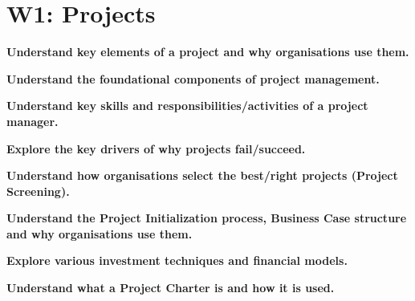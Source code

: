 \section{W1: Projects}

\textbf{Understand key elements of a project and why organisations use them.}

\textbf{Understand the foundational components of project management.}

\textbf{Understand key skills and responsibilities/activities of a project manager.}

\textbf{Explore the key drivers of why projects fail/succeed.}

\textbf{Understand how organisations select the best/right projects (Project Screening).}

\textbf{Understand the Project Initialization process, Business Case structure and why organisations use them.}

\textbf{Explore various investment techniques and financial models.}

\textbf{Understand what a Project Charter is and how it is used.}

